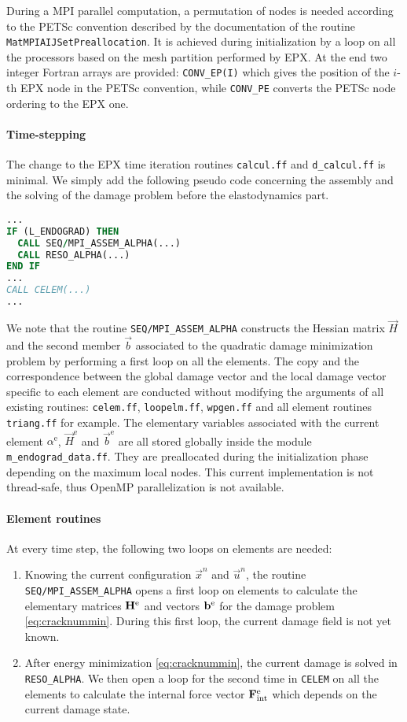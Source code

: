 During a MPI parallel computation, a permutation of nodes is needed according to the PETSc convention described by the documentation of the routine \texttt{MatMPIAIJSetPreallocation}. It is achieved during initialization by a loop on all the processors based on the mesh partition performed by EPX. At the end two integer Fortran arrays are provided: \texttt{CONV\_EP(I)} which gives the position of the $i$-th EPX node in the PETSc convention, while \texttt{CONV\_PE} converts the PETSc node ordering to the EPX one.

\paragraph{Time-stepping} The change to the EPX time iteration routines \texttt{calcul.ff} and \texttt{d\_calcul.ff} is minimal. We simply add the following pseudo code concerning the assembly and the solving of the damage problem before the elastodynamics part.
\begin{lstlisting}[language=Fortran]
...
IF (L_ENDOGRAD) THEN
  CALL SEQ/MPI_ASSEM_ALPHA(...)
  CALL RESO_ALPHA(...)
END IF
...
CALL CELEM(...)
...
\end{lstlisting}

We note that the routine \texttt{SEQ/MPI\_ASSEM\_ALPHA} constructs the Hessian matrix $\vec{H}$ and the second member $\vec{b}$ associated to the quadratic damage minimization problem by performing a first loop on all the elements. The copy and the correspondence between the global damage vector and the local damage vector specific to each element are conducted without modifying the arguments of all existing routines: \texttt{celem.ff}, \texttt{loopelm.ff}, \texttt{wpgen.ff} and all element routines \texttt{triang.ff} for example. The elementary variables associated with the current element $\alpha^\mathrm{e}$, $\vec{H}^\mathrm{e}$ and $\vec{b}^\mathrm{e}$ are all stored globally inside the module \texttt{m\_endograd\_data.ff}. They are preallocated during the initialization phase depending on the maximum local nodes. This current implementation is not thread-safe, thus OpenMP parallelization is not available.

\paragraph{Element routines} At every time step, the following two loops on elements are needed:
\begin{enumerate}
\item Knowing the current configuration $\vec{x}^n$ and $\vec{u}^n$, the routine \texttt{SEQ/MPI\_ASSEM\_ALPHA} opens a first loop on elements to calculate the elementary matrices $\vec{H}^\me$ and vectors $\vec{b}^\me$ for the damage problem \eqref{eq:cracknummin}. During this first loop, the current damage field is not yet known.

\item After energy minimization \eqref{eq:cracknummin}, the current damage is solved in \texttt{RESO\_ALPHA}. We then open a loop for the second time in \texttt{CELEM} on all the elements to calculate the internal force vector $\vec{F}_\mathrm{int}^\me$ which depends on the current damage state.
\end{enumerate}

